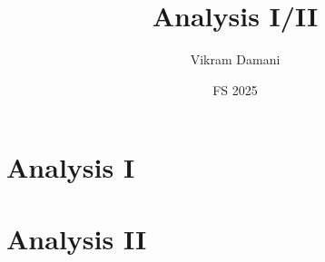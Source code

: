 \documentclass[justified,nobib]{tufte-book}
\title{Analysis I/II}
\author{Vikram Damani}
\date{FS 2025}
\begin{document}
  \frontmatter{}

  \maketitle

  \tableofcontents

  \mainmatter\setcounter{page}{1}

  \part{Analysis I}\label{part1}
  

  \part{Analysis II}\label{part2}
  
\end{document}
